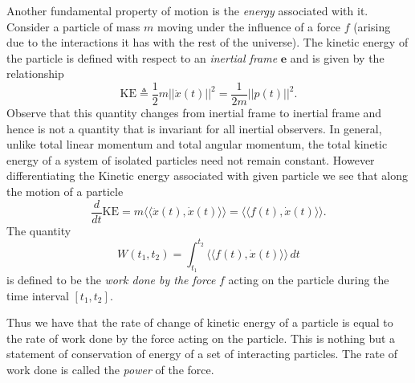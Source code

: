 \documentclass[graybox,envcountchap,sectrefs]{svmonoMuga}
\begin{document}
Another fundamental property of motion is the \emph{energy} associated with it. Consider a particle of mass $m$ moving under the influence of a force $f$ (arising due to the interactions it has with the rest of the universe). The kinetic energy of the particle is defined with respect to an \textit{inertial frame} $\mathbf{e}$ and is given by the relationship
\begin{equation*}
\mathrm{KE} \triangleq \frac{1}{2}m ||\dot{x}(t)||^2 =\frac{1}{2m} ||p(t)||^2.
\end{equation*}
Observe that this quantity changes from inertial frame to inertial frame and hence is not a quantity that is invariant for all inertial observers. In general, unlike total linear momentum and total angular momentum, the total kinetic energy of a system of isolated particles need not remain constant. However differentiating the Kinetic energy associated with given particle we see that along the motion of a particle
\begin{equation*}
\dfrac{d }{dt} \mathrm{KE}= m \langle \langle \ddot{x}(t),\dot{x}(t)\rangle\rangle=\langle \langle f(t),\dot{x}(t)\rangle\rangle.
\end{equation*}
The quantity 
\[
W(t_1,t_2)=\int_{t_1}^{t_2}\langle \langle f(t),\dot{x}(t)\rangle\rangle\,dt
\]
is defined to be the \emph{work done by the force} $f$ acting on the particle during the time interval $[t_1,t_2]$. 
\begin{svgraybox}
Thus we have that the rate of change of kinetic energy of a particle is equal to the rate of work done by the force acting on the particle. This is nothing but a statement of conservation of energy of a set of interacting particles. The rate of work done is called the \emph{power} of the force.
\end{svgraybox}


\end{document}
